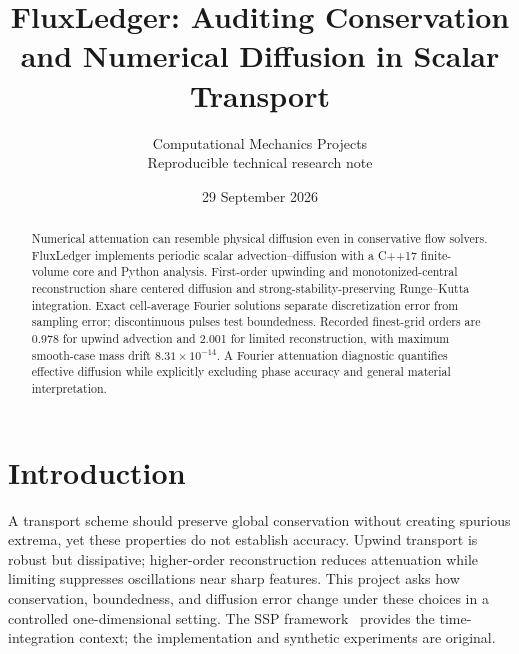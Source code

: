\documentclass[10pt,a4paper]{article}
\title{\vspace{-1.3cm}\LARGE FluxLedger: Auditing Conservation and Numerical Diffusion in Scalar Transport}
\author{\small Computational Mechanics Projects\\\small Reproducible technical research note}
\date{\small 29 September 2026}
\begin{document}
\maketitle\thispagestyle{fancy}

\begin{abstract}
Numerical attenuation can resemble physical diffusion even in conservative flow solvers. FluxLedger implements periodic scalar advection--diffusion with a C++17 finite-volume core and Python analysis. First-order upwinding and monotonized-central reconstruction share centered diffusion and strong-stability-preserving Runge--Kutta integration. Exact cell-average Fourier solutions separate discretization error from sampling error; discontinuous pulses test boundedness. Recorded finest-grid orders are 0.978 for upwind advection and 2.001 for limited reconstruction, with maximum smooth-case mass drift $8.31\times10^{-14}$. A Fourier attenuation diagnostic quantifies effective diffusion while explicitly excluding phase accuracy and general material interpretation.
\end{abstract}
\section{Introduction}
A transport scheme should preserve global conservation without creating spurious extrema, yet these properties do not establish accuracy. Upwind transport is robust but dissipative; higher-order reconstruction reduces attenuation while limiting suppresses oscillations near sharp features. This project asks how conservation, boundedness, and diffusion error change under these choices in a controlled one-dimensional setting. The SSP framework~\cite{ssp} provides the time-integration context; the implementation and synthetic experiments are original.
\end{document}
